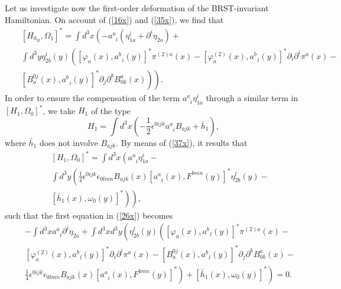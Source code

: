 \documentclass[a4paper,12pt]{article}
\begin{document}
Let us investigate now the first-order deformation of the BRST-invariant
Hamiltonian. On account of (\ref{16x}) and (\ref{35x}), we find that 
\begin{eqnarray}
&&\left[ H_{0_{B}},\Omega _{1}\right] ^{*}=\int d^{3}x\left(
-a_{\;\;i}^{a}\left( \eta _{1a}^{i}+\partial ^{i}\eta _{2a}\right) +\right. 
\nonumber \\
&&\int d^{3}y\eta _{2b}^{i}\left( y\right) \left( \left[ \varphi _{a}\left(
x\right) ,a_{\;\;i}^{b}\left( y\right) \right] ^{*}\pi ^{(2)a}\left(
x\right) -\left[ \varphi _{a}^{\left( 2\right) }\left( x\right)
,a_{\;\;i}^{b}\left( y\right) \right] ^{*}\partial _{i}\partial ^{i}\pi
^{a}\left( x\right) -\right.  \nonumber \\
&&\left. \left. \left[ B_{a}^{0j}\left( x\right) ,a_{\;\;i}^{b}\left(
y\right) \right] ^{*}\partial _{j}\partial ^{k}B_{0k}^{a}\left( x\right)
\right) \right) .  \label{36x}
\end{eqnarray}
In order to ensure the compensation of the term $a_{\;\;i}^{a}\eta _{1a}^{i}$
through a similar term in $\left[ H_{1},\Omega _{0}\right] ^{*}$, we take $%
H_{1}$ of the type 
\begin{equation}
H_{1}=\int d^{3}x\left( -\frac{1}{2}\epsilon ^{0ijk}a_{\;\;i}^{a}B_{ajk}+%
\bar{h}_{1}\right) ,  \label{37x}
\end{equation}
where $\bar{h}_{1}$ does not involve $B_{ajk}$. By means of (\ref{37x}), it
results that 
\begin{eqnarray}
& &\left[ H_{1},\Omega _{0}\right] ^{*}=\int d^{3}x\left( a_{\;\;i}^{a}\eta
_{1a}^{i}-\right.  \nonumber \\
& &\int d^{3}y\left( \frac{1}{4}\epsilon ^{0ijk}\epsilon
_{0lmn}B_{ajk}\left( x\right) \left[ a_{\;\;i}^{a}\left( x\right)
,F^{bmn}\left( y\right) \right] ^{*}\eta _{2b}^{l}\left( y\right) -\right. 
\nonumber \\
& &\left. \left. \left[ \bar{h}_{1}\left( x\right) ,\omega _{0}\left(
y\right) \right] ^{*}\right) \right) ,  \label{38x}
\end{eqnarray}
such that the first equation in (\ref{26x}) becomes 
\begin{eqnarray}
&&-\int d^{3}xa_{\;\;i}^{a}\partial ^{i}\eta _{2a}+\int d^{3}xd^{3}y\left(
\eta _{2b}^{l}\left( y\right) \left( \left[ \varphi _{a}\left( x\right)
,a_{\;\;l}^{b}\left( y\right) \right] ^{*}\pi ^{(2)a}\left( x\right)
-\right. \right.  \nonumber \\
&&\left[ \varphi _{a}^{\left( 2\right) }\left( x\right) ,a_{\;\;l}^{b}\left(
y\right) \right] ^{*}\partial _{i}\partial ^{i}\pi ^{a}\left( x\right)
-\left[ B_{a}^{0j}\left( x\right) ,a_{\;\;l}^{b}\left( y\right) \right]
^{*}\partial _{j}\partial ^{k}B_{0k}^{a}\left( x\right) -  \nonumber \\
&&\left. \left. \frac{1}{4}\epsilon ^{0ijk}\epsilon _{0lmn}B_{ajk}\left(
x\right) \left[ a_{\;\;i}^{a}\left( x\right) ,F^{bmn}\left( y\right) \right]
^{*}\right) +\left[ \bar{h}_{1}\left( x\right) ,\omega _{0}\left( y\right)
\right] ^{*}\right) =0.  \label{39x}
\end{eqnarray}
\end{document}
